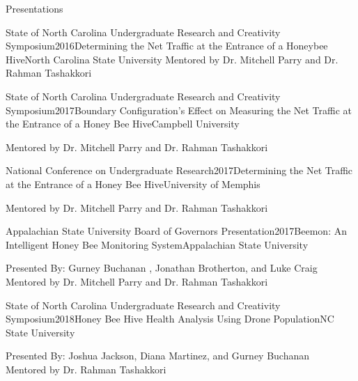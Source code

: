 \documentclass{resume} %
\begin{document}

\begin{rSection}{Presentations}
\begin{rSubsection}{State of North Carolina Undergraduate Research and Creativity Symposium}{2016}{Determining the Net Traffic at the Entrance of a Honeybee Hive}{North Carolina State University}
    Mentored by Dr. Mitchell Parry and Dr. Rahman Tashakkori 
\end{rSubsection}
\begin{rSubsection}{State of North Carolina Undergraduate Research and Creativity Symposium}{2017}{Boundary Configuration's Effect on Measuring the Net Traffic at the Entrance of a Honey Bee Hive}{Campbell University}{}
    \item Mentored by Dr. Mitchell Parry and Dr. Rahman Tashakkori 
\end{rSubsection}
\begin{rSubsection}{National Conference on Undergraduate Research}{2017}{Determining the Net Traffic at the Entrance of a Honey Bee Hive}{University of Memphis}{}
    \item Mentored by Dr. Mitchell Parry and Dr. Rahman Tashakkori 
\end{rSubsection}
\begin{rSubsection}{Appalachian State University Board of Governors Presentation}{2017}{Beemon: An Intelligent Honey Bee Monitoring System}{Appalachian State University}{}
    \item Presented By: Gurney Buchanan , Jonathan Brotherton, and Luke Craig\\
    Mentored by Dr. Mitchell Parry and Dr. Rahman Tashakkori 
\end{rSubsection}
\begin{rSubsection}{State of North Carolina Undergraduate Research and Creativity Symposium}{2018}{Honey Bee Hive Health Analysis Using Drone Population}{NC State University}{}
    \item Presented By: Joshua Jackson, Diana Martinez, and Gurney Buchanan\\
    Mentored by Dr. Rahman Tashakkori 
\end{rSubsection}
\end{rSection}
\end{document}

